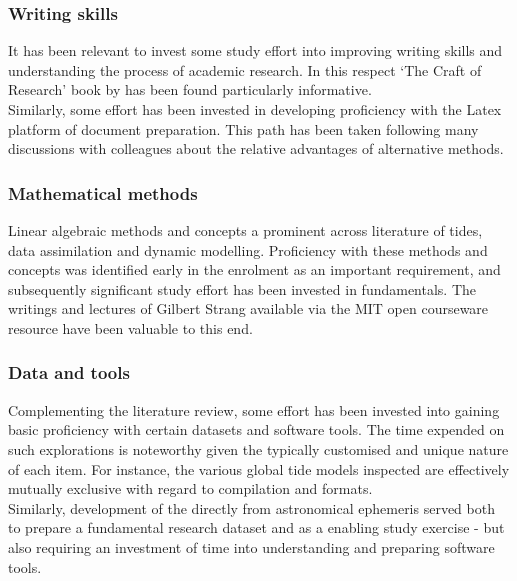 \subsubsection{Writing skills}
It has been relevant to invest some study effort into improving writing skills and understanding the process of academic research.  In this respect `The Craft of Research' book by \citep{Booth:2009vy} has been found particularly informative. \\


Similarly, some effort has been invested in developing proficiency with the Latex platform of document preparation.  This path has been taken following many discussions with colleagues about the relative advantages of alternative methods.


\subsubsection{Mathematical methods}
Linear algebraic methods and concepts a prominent across literature of tides, data assimilation and dynamic modelling.   Proficiency with these methods and concepts was identified early in the enrolment as an important requirement, and subsequently significant study effort has been invested in fundamentals.  The writings and lectures of Gilbert Strang available via the MIT open courseware resource have been valuable to this end. \citep{Strang:2010tk}


\subsubsection{Data and tools}
Complementing the literature review, some effort has been invested into gaining basic proficiency with certain datasets and software tools.  The time expended on such explorations is noteworthy given the typically customised and unique nature of each item. For instance, the various global tide models inspected are effectively mutually exclusive with regard to compilation and formats.\\
Similarly, development of the \ATGP{} directly from astronomical ephemeris served both to prepare a fundamental research dataset and as a enabling study exercise - but also requiring an investment of time into understanding and preparing software tools.





